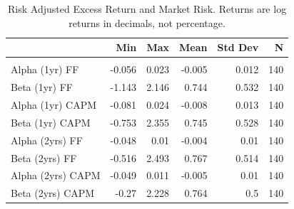 \begin{table}
\caption{Risk Adjusted Excess Return and Market Risk. Returns are log returns in decimals, not percentage.}
\label{table:risadjret}
\begin{tabular}{lrrrrr}
\toprule
 & Min & Max & Mean & Std Dev & N \\
\midrule\addlinespace[0.4mm]\midrule
2011 &  &  &  &  &  \\
\quad Alpha (1yr) FF & -0.056 & 0.023 & -0.005 & 0.012 & 140 \\
\quad Beta (1yr) FF & -1.143 & 2.146 & 0.744 & 0.532 & 140 \\
\quad Alpha (1yr) CAPM & -0.081 & 0.024 & -0.008 & 0.013 & 140 \\
\quad Beta (1yr) CAPM & -0.753 & 2.355 & 0.745 & 0.528 & 140 \\
\quad Alpha (2yrs) FF & -0.048 & 0.01 & -0.004 & 0.01 & 140 \\
\quad Beta (2yrs) FF & -0.516 & 2.493 & 0.767 & 0.514 & 140 \\
\quad Alpha (2yrs) CAPM & -0.049 & 0.011 & -0.005 & 0.01 & 140 \\
\quad Beta (2yrs) CAPM & -0.27 & 2.228 & 0.764 & 0.5 & 140 \\
\bottomrule
\end{tabular}
\end{table}
